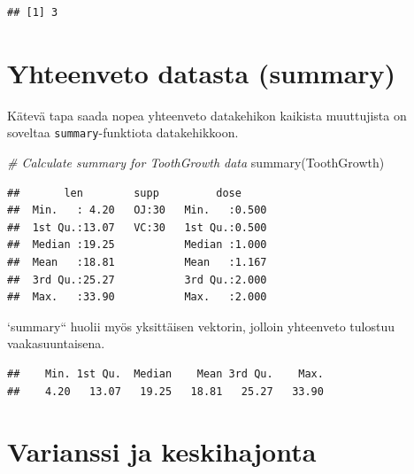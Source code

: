 \documentclass[
]{book}
\newenvironment{Shaded}{\begin{snugshade}}{\end{snugshade}}
\newcommand{\CommentTok}[1]{\textcolor[rgb]{0.56,0.35,0.01}{\textit{#1}}}
\newcommand{\FunctionTok}[1]{\textcolor[rgb]{0.00,0.00,0.00}{#1}}
\newcommand{\NormalTok}[1]{#1}
\newcommand{\OtherTok}[1]{\textcolor[rgb]{0.56,0.35,0.01}{#1}}
\newcommand{\SpecialCharTok}[1]{\textcolor[rgb]{0.00,0.00,0.00}{#1}}
\begin{document}
\begin{verbatim}
## [1] 3
\end{verbatim}

\hypertarget{yhteenveto-datasta-summary}{%
\section{Yhteenveto datasta (summary)}\label{yhteenveto-datasta-summary}}

Kätevä tapa saada nopea yhteenveto datakehikon kaikista muuttujista on soveltaa \texttt{summary}-funktiota datakehikkoon.

\begin{Shaded}
\begin{Highlighting}[]
\CommentTok{\# Calculate summary for ToothGrowth data}
\FunctionTok{summary}\NormalTok{(ToothGrowth)}
\end{Highlighting}
\end{Shaded}

\begin{verbatim}
##       len        supp         dose      
##  Min.   : 4.20   OJ:30   Min.   :0.500  
##  1st Qu.:13.07   VC:30   1st Qu.:0.500  
##  Median :19.25           Median :1.000  
##  Mean   :18.81           Mean   :1.167  
##  3rd Qu.:25.27           3rd Qu.:2.000  
##  Max.   :33.90           Max.   :2.000
\end{verbatim}

`summary`` huolii myös yksittäisen vektorin, jolloin yhteenveto tulostuu vaakasuuntaisena.

\begin{Shaded}
\end{Shaded}

\begin{verbatim}
##    Min. 1st Qu.  Median    Mean 3rd Qu.    Max. 
##    4.20   13.07   19.25   18.81   25.27   33.90
\end{verbatim}

\hypertarget{varianssi-ja-keskihajonta}{%
\section{Varianssi ja keskihajonta}\label{varianssi-ja-keskihajonta}}
\end{document}
